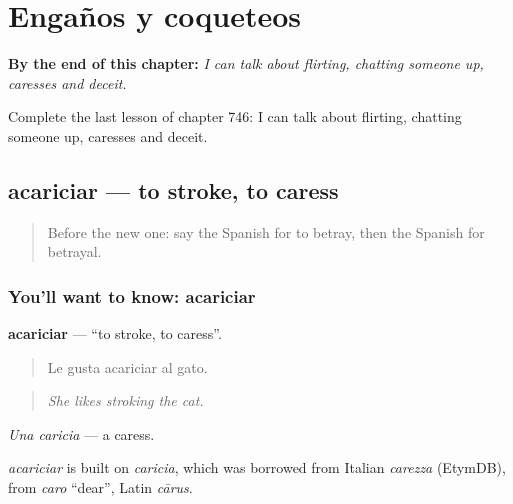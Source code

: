 
\chapter{Engaños y coqueteos}
\label{ch:es-enganos-y-coqueteos}

\begin{chapteropening}
\textbf{By the end of this chapter:} \emph{I can talk about flirting, chatting someone up, caresses and deceit.}

Complete the last lesson of chapter 746: I can talk about flirting, chatting someone up, caresses and deceit.
\end{chapteropening}

\section[acariciar]{acariciar — to stroke, to caress}

\label{lesson:ES-C746-acariciar}



\begin{quote}
Before the new one: say the Spanish for to betray, then the Spanish for betrayal.
\end{quote}

\subsection*{You'll want to know: acariciar}
\textbf{acariciar} — \textquotedblleft{}to stroke, to caress\textquotedblright{}.

\begin{quote}
Le gusta acariciar al gato.
\end{quote}

\begin{quote}
\emph{She likes stroking the cat.}
\end{quote}

\emph{Una caricia} — a caress.

\begin{cousinweb}
\emph{acariciar} is built on \emph{caricia}, which was borrowed from Italian \emph{carezza} (EtymDB), from \emph{caro} \textquotedblleft{}dear\textquotedblright{}, Latin \emph{cārus}.
\end{cousinweb}

